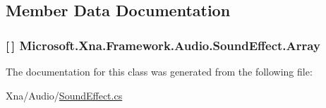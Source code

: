\subsection{Member Data Documentation}
\hypertarget{class_microsoft_1_1_xna_1_1_framework_1_1_audio_1_1_sound_effect_ae7a3105375ce9039d98625a68f50f747}{}
\subsubsection[{Array}]{ \mbox{[}$\,$\mbox{]} Microsoft.\+Xna.\+Framework.\+Audio.\+Sound\+Effect.\+Array\hspace{0.3cm}{\ttfamily [static]}}\label{class_microsoft_1_1_xna_1_1_framework_1_1_audio_1_1_sound_effect_ae7a3105375ce9039d98625a68f50f747}


The documentation for this class was generated from the following file\+:\begin{DoxyCompactItemize}
\item 
Xna/\+Audio/\hyperlink{_sound_effect_8cs}{Sound\+Effect.\+cs}\end{DoxyCompactItemize}
